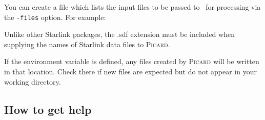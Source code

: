 You can create a file which lists the input files to be passed to
\picard\ for processing via the
\texttt{-files} option. For example:

\begin{terminalv}
\end{terminalv}

\begin{tip}
  Unlike other Starlink packages, the .sdf extension must be included
  when supplying the names of Starlink data files to \textsc{Picard}.
\end{tip}

\begin{tip}
  If the environment variable  is defined, any
  files created by \textsc{Picard} will be written in that
  location. Check there if new files are expected but do not appear in
  your working directory.
\end{tip}

\newpage

\subsection{How to get help}
\label{sec:help}

